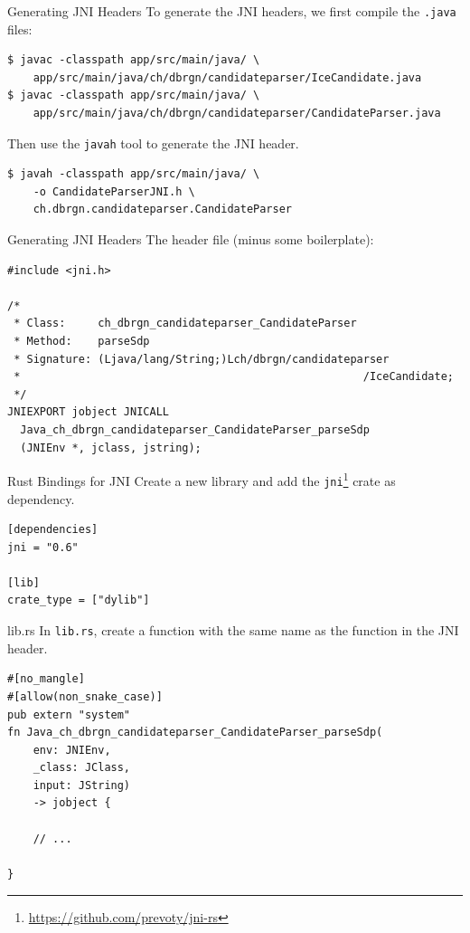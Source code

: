 \documentclass[aspectratio=1610,14pt,t]{beamer}
\begin{document}
\begin{frame}[c,fragile]{Generating JNI Headers}
  To generate the JNI headers, we first compile the \texttt{.java} files:

  \begin{verbatim}
$ javac -classpath app/src/main/java/ \
    app/src/main/java/ch/dbrgn/candidateparser/IceCandidate.java
$ javac -classpath app/src/main/java/ \
    app/src/main/java/ch/dbrgn/candidateparser/CandidateParser.java
  \end{verbatim}

  Then use the \texttt{javah} tool to generate the JNI header.

  \begin{verbatim}
$ javah -classpath app/src/main/java/ \
    -o CandidateParserJNI.h \
    ch.dbrgn.candidateparser.CandidateParser
  \end{verbatim}
\end{frame}

\begin{frame}[c,fragile]{Generating JNI Headers}
  The header file (minus some boilerplate):
  \begin{verbatim}
#include <jni.h>

/*
 * Class:     ch_dbrgn_candidateparser_CandidateParser
 * Method:    parseSdp
 * Signature: (Ljava/lang/String;)Lch/dbrgn/candidateparser
 *                                                     /IceCandidate;
 */
JNIEXPORT jobject JNICALL
  Java_ch_dbrgn_candidateparser_CandidateParser_parseSdp
  (JNIEnv *, jclass, jstring);
  \end{verbatim}

\end{frame}

\begin{frame}[c,fragile]{Rust Bindings for JNI}
  Create a new library and add the
  \texttt{jni}\footnote{\url{https://github.com/prevoty/jni-rs}} crate as
  dependency.

  \begin{verbatim}
[dependencies]
jni = "0.6"

[lib]
crate_type = ["dylib"]
  \end{verbatim}

\end{frame}

\begin{frame}[c,fragile]{lib.rs}
  In \texttt{lib.rs}, create a function with the same name as the function in
  the JNI header.

  \begin{verbatim}
#[no_mangle]
#[allow(non_snake_case)]
pub extern "system"
fn Java_ch_dbrgn_candidateparser_CandidateParser_parseSdp(
    env: JNIEnv,
    _class: JClass,
    input: JString)
    -> jobject {

    // ...

}
  \end{verbatim}

\end{frame}
\end{document}
